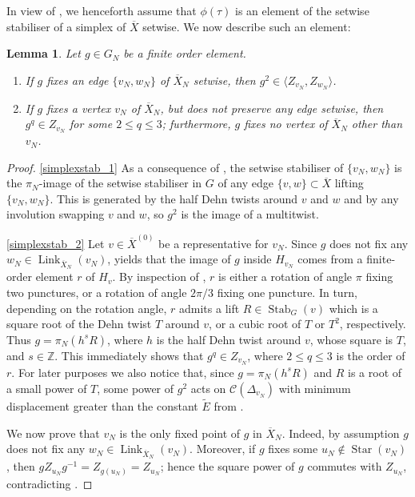 \documentclass[svgnames]{amsart}
\theoremstyle{plain}
\newtheorem{lem}[thm]{Lemma}
\theoremstyle{definition}
\newcommand{\C}[1]{\mathcal{C}(#1)}
\newcommand{\link}[2]{\operatorname{Link}_{#1}\left(#2\right)}
\newcommand{\CStar}[1]{\operatorname{Star}\left(#1\right)}
\newcommand{\Z}{\mathbb{Z}}
\newcommand{\Stab}[2]{\operatorname{Stab}_{#1}\left(#2\right)}
\newcommand{\ov}[1]{\overline{#1}}
\begin{document}
    \noindent In view of , we henceforth assume that $\phi(\tau)$ is an element of the setwise stabiliser of a simplex of $\ov X$ setwise. We now describe such an element:
    \begin{lem}\label{lem:simplexstab}
        Let $g\in G_N$ be a finite order element.
        \begin{enumerate}
            \item\label{simplexstab_1} If $g$ fixes an edge $\{v_N,w_N\}$ of $\ov X_N$ setwise, then $g^2\in \langle Z_{v_N}, Z_{w_N}\rangle$.
            \item\label{simplexstab_2} If $g$ fixes a vertex $v_N$ of $\ov X_N$, but does not preserve any edge setwise, then $g^q\in Z_{v_N}$ for some $2\le q\le 3$; furthermore, $g$ fixes no vertex of $\ov X_N$ other than $v_N$.
        \end{enumerate}
    \end{lem}

    \begin{proof}
        \eqref{simplexstab_1} As a consequence of \cite[Corollary 3.18]{short_HHG:II}, the setwise stabiliser of $\{v_N,w_N\}$ is the $\pi_N$-image of the setwise stabiliser in $G$ of any edge $\{v,w\}\subset \ov X$ lifting $\{v_N,w_N\}$. This is generated by the half Dehn twists around $v$ and $w$ and by any involution swapping $v$ and $w$, so $g^2$ is the image of a multitwist.

        \eqref{simplexstab_2} Let $v\in \ov X^{(0)}$ be a representative for $v_N$. Since $g$ does not fix any $w_N\in \link{\ov X_N}{v_N}$,  yields that the image of $g$ inside $H_{v_N}$ comes from a finite-order element $r$ of $H_v$. By inspection of \cite[Section 7.1.1]{FM_primer}, $r$ is either a rotation of angle $\pi$ fixing two punctures, or a rotation of angle $2\pi/3$ fixing one puncture. In turn, depending on the rotation angle, $r$ admits a lift $R\in \Stab{G}{v}$ which is a square root of the Dehn twist $T$ around $v$, or a cubic root of $T$ or $T^2$, respectively. Thus $g=\pi_N(h^s R)$, where $h$ is the half Dehn twist around $v$, whose square is $T$, and $s\in \Z$. This immediately shows that $g^q\in Z_{v_N}$, where $2\le q\le 3$ is the order of $r$. For later purposes we also notice that, since $g=\pi_N(h^s R)$ and $R$ is a root of a small power of $T$, some power of $g^2$ acts on $\C{\Delta_{v_N}}$ with minimum displacement greater than the constant $\widetilde{E}$ from .

        We now prove that $v_{N}$ is the only fixed point of $g$ in $\ov X_N$. Indeed, by assumption $g$ does not fix any $w_N\in \link{\ov X_N}{v_N}$. Moreover, if $g$ fixes some $u_N\not\in\CStar{v_N}$, then $gZ_{u_N}g^{-1}=Z_{g(u_N)}=Z_{u_N}$; hence the square power of $g$ commutes with $Z_{u_N}$, contradicting .
    \end{proof}
    
\end{document}
